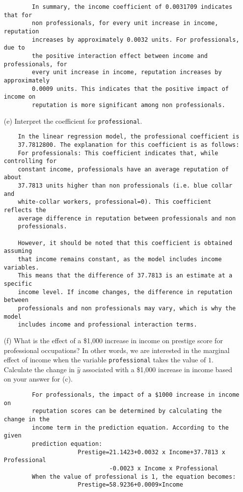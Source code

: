 \documentclass[12pt,letterpaper]{article}
\begin{document}
\begin{enumerate}
\begin{verbatim}
		In summary, the income coefficient of 0.0031709 indicates that for 
		non professionals, for every unit increase in income, reputation 
		increases by approximately 0.0032 units. For professionals, due to 
		the positive interaction effect between income and professionals, for 
		every unit increase in income, reputation increases by approximately 
		0.0009 units. This indicates that the positive impact of income on 
		reputation is more significant among non professionals.
	\end{verbatim}	
	\item [(e)]
	Interpret the coefficient for \texttt{professional}.
	\begin{verbatim}
	In the linear regression model, the professional coefficient is 
	37.7812800. The explanation for this coefficient is as follows:
	For professionals: This coefficient indicates that, while controlling for 
	constant income, professionals have an average reputation of about 
	37.7813 units higher than non professionals (i.e. blue collar and 
	white-collar workers, professional=0). This coefficient reflects the 
	average difference in reputation between professionals and non 
	professionals.
	
	However, it should be noted that this coefficient is obtained assuming 
	that income remains constant, as the model includes income variables. 
	This means that the difference of 37.7813 is an estimate at a specific 
	income level. If income changes, the difference in reputation between 
	professionals and non professionals may vary, which is why the model 
	includes income and professional interaction terms.
\end{verbatim}
	\newpage
	\item [(f)]
	What is the effect of a \$1,000 increase in income on prestige score for professional occupations? In other words, we are interested in the marginal effect of income when the variable \texttt{professional} takes the value of $1$. Calculate the change in $\hat{y}$ associated with a \$1,000 increase in income based on your answer for (c).
	\begin{verbatim}
		For professionals, the impact of a $1000 increase in income on 
		reputation scores can be determined by calculating the change in the 
		income term in the prediction equation. According to the given 
		prediction equation: 
		             Prestige=21.1423+0.0032 x Income+37.7813 x Professional 
		                      -0.0023 x Income x Professional
		When the value of professional is 1, the equation becomes:
		             Prestige=58.9236+0.0009×Income
		

\end{verbatim}
\end{enumerate}
\end{document}
